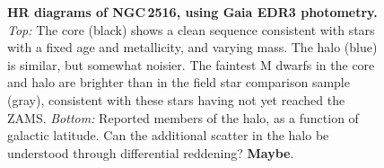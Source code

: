 \documentclass[12pt,twocolumn,tighten]{aastex63}
\begin{document}
\begin{figure}[t]
	\begin{center}
		\leavevmode
	
	\end{center}
	\vspace{-0.7cm}
  \caption{ {\bf HR diagrams of NGC\,2516, using Gaia EDR3 photometry.}
    {\it Top:} The core (black) shows a clean sequence consistent with
    stars with a fixed age and metallicity, and varying mass.  The
    halo (blue) is similar, but somewhat noisier.  The faintest M
    dwarfs in the core and halo are brighter than in the field star
    comparison sample (gray), consistent with these stars having not
    yet reached the ZAMS.
    {\it Bottom:} Reported members of the halo, as a function of
    galactic latitude. Can the additional scatter in the halo be
    understood through differential reddening?
    {\bf Maybe}.
    \label{fig:hr}
  }
\end{figure}
\end{document}
